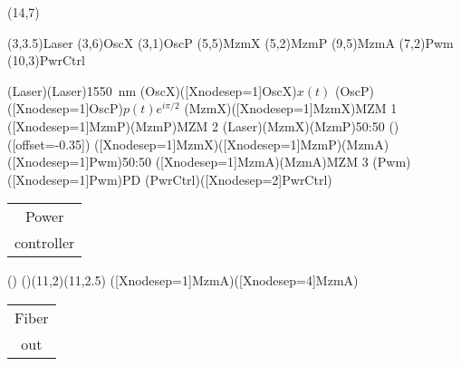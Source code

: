 \documentclass[pstricks]{standalone}
\begin{document}
	\begin{pspicture}(14,7)
		\begin{optexp}
			
		  	\pnode(3,3.5){Laser}
		  	\pnode(3,6){OscX}
		  	\pnode(3,1){OscP}
		  	\pnode(5,5){MzmX}
		  	\pnode(5,2){MzmP}
		  	\pnode(9,5){MzmA}
		  	\pnode(7,2){Pwm}
		  	\pnode(10,3){PwrCtrl}
		  	
			\optbox[position=start, optboxsize=2 1, labeloffset=0](Laser)(Laser){\SI{1550}{\nano\meter}}
			\elecsynthesizer[compname=OscX, wire=none, labeloffset=1.2, labelangle=-90](OscX)([Xnodesep=1]OscX){$x(t)$}
			\elecsynthesizer[compname=OscP, wire=none, labeloffset=1.2, labelangle=-90](OscP)([Xnodesep=1]OscP){$p(t)e^{i\pi/2}$}
			\optmzm[compname=MzmX, extnode=t](MzmX)([Xnodesep=1]MzmX){MZM 1}
			\optmzm[compname=MzmP, extnode=b]([Xnodesep=1]MzmP)(MzmP){MZM 2}
			\wdmsplitter[labeloffset=0.5](Laser)(MzmX)(MzmP){50:50}
			()
			([offset=-0.35])
			\optcoupler[labeloffset=0.5]([Xnodesep=1]MzmX)([Xnodesep=1]MzmP)(MzmA)([Xnodesep=1]Pwm){50:50}
			\optmzm[compname=MzmA, extnode=b]([Xnodesep=1]MzmA)(MzmA){MZM 3}
			\optdetector[compname=PD, extnode=r, dettype=diode](Pwm)([Xnodesep=1]Pwm){PD}
			\optbox[compname=PwrCtrl, labeloffset=0, optboxsize=2 1](PwrCtrl)([Xnodesep=2]PwrCtrl){\begin{tabular}{@{}c@{}}Power\\controller\end{tabular}}
			()
			\drawwire()(11,2)(11,2.5)
			\optfiber[addtoFiberOut={arrows=->}]([Xnodesep=1]MzmA)([Xnodesep=4]MzmA){\begin{tabular}{@{}c@{}}Fiber\\out\end{tabular}}
		\end{optexp}
	\end{pspicture}
\end{document}
